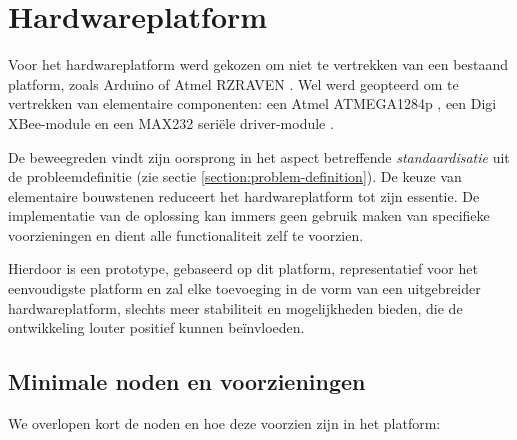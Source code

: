 
\chapter{Hardwareplatform}
\label{hardware-platform}

Voor het hardwareplatform werd gekozen om niet te vertrekken van een bestaand
platform, zoals Arduino \citep{url:arduino} of Atmel RZRAVEN
\citep{manual:rzraven}. Wel werd geopteerd om te vertrekken van elementaire
componenten: een Atmel ATMEGA1284p \mcu \citep{datasheet:atmega1284p}, een Digi
XBee-module \citep{manual:xbee} en een MAX232 seri\"ele driver-module
\citep{datasheet:max232}.

De beweegreden vindt zijn oorsprong in het aspect betreffende
\emph{standaardisatie} uit de probleemdefinitie (zie sectie
\ref{section:problem-definition}). De keuze van elementaire bouwstenen
reduceert het hardwareplatform tot zijn essentie. De implementatie van de
oplossing kan immers geen gebruik maken van specifieke voorzieningen en dient
alle functionaliteit zelf te voorzien.

Hierdoor is een prototype, gebaseerd op dit platform, representatief voor het
eenvoudigste platform en zal elke toevoeging in de vorm van een uitgebreider
hardwareplatform, slechts meer stabiliteit en mogelijkheden bieden, die de
ontwikkeling louter positief kunnen be\"invloeden.

\section{Minimale noden en voorzieningen}

We overlopen kort de noden en hoe deze voorzien zijn in het platform:


